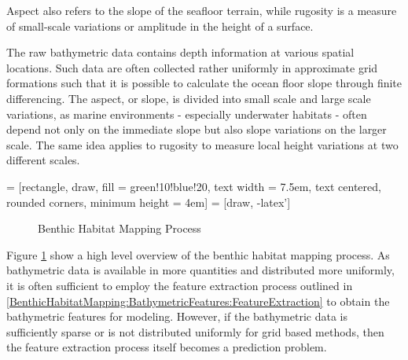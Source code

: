 		Aspect also refers to the slope of the seafloor terrain, while rugosity is a measure of small-scale variations or amplitude in the height of a surface.
		
		The raw bathymetric data contains depth information at various spatial locations. Such data are often collected rather uniformly in approximate grid formations such that it is possible to calculate the ocean floor slope through finite differencing. The aspect, or slope, is divided into small scale and large scale variations, as marine environments - especially underwater habitats - often depend not only on the immediate slope but also slope variations on the larger scale. The same idea applies to rugosity to measure local height variations at two different scales.
		
		 = [rectangle, draw, fill = green!10!blue!20, text width = 7.5em, text centered, rounded corners, minimum height = 4em]
		 = [draw, -latex']
	
		\begin{figure}[!ht]
		\centering{}		
		\caption{Benthic Habitat Mapping Process}
		\label{Figure:BenthicHabitatMappingProcess}
		\end{figure}
		
		Figure \ref{Figure:BenthicHabitatMappingProcess} show a high level overview of the benthic habitat mapping process. As bathymetric data is available in more quantities and distributed more uniformly, it is often sufficient to employ the feature extraction process outlined in \cref{BenthicHabitatMapping:BathymetricFeatures:FeatureExtraction} to obtain the bathymetric features for modeling. However, if the bathymetric data is sufficiently sparse or is not distributed uniformly for grid based methods, then the feature extraction process itself becomes a prediction problem.

